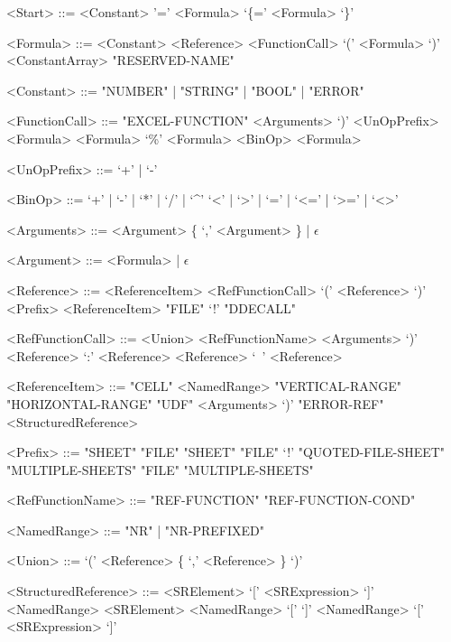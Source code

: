 \begin{grammar}
<Start> ::= <Constant>
	\alt '=' <Formula>
	\alt `\{=' <Formula> `\}'

<Formula> ::= <Constant>
         \alt <Reference>
         \alt <FunctionCall>
         \alt `(' <Formula> `)'
         \alt <ConstantArray>
         \alt "RESERVED-NAME"
         
<Constant> ::= "NUMBER" | "STRING" | "BOOL" | "ERROR"
         
<FunctionCall> ::= "EXCEL-FUNCTION" <Arguments> `)'
		\alt <UnOpPrefix> <Formula>
		\alt <Formula> `\%'
		\alt <Formula> <BinOp> <Formula>
		
<UnOpPrefix> ::= `+' | `-'

<BinOp> ::= `+' | `-' | `*' | `/' | `\textasciicircum'
	\alt `<' | `>' | `=' | `<=' | `>=' | `<>'

	
<Arguments> ::= <Argument> \{ `,' <Argument> \} | $\epsilon$

<Argument> ::= <Formula> | $\epsilon$

<Reference> ::= <ReferenceItem>
    \alt <RefFunctionCall>
	\alt `(' <Reference> `)' 
	\alt <Prefix> <ReferenceItem>
	\alt "FILE" `!' "DDECALL"

<RefFunctionCall> ::= <Union>
    \alt <RefFunctionName> <Arguments> `)'
    \alt <Reference> `:' <Reference>
	\alt <Reference> `\ ' <Reference>
    
<ReferenceItem> ::= "CELL"
	\alt <NamedRange>
	\alt "VERTICAL-RANGE"
	\alt "HORIZONTAL-RANGE"
	\alt "UDF" <Arguments> `)'
	\alt "ERROR-REF"
	\alt <StructuredReference>
	
<Prefix> ::= "SHEET"
	\alt "FILE" "SHEET"
	\alt "FILE" `!'
	\alt "QUOTED-FILE-SHEET"
	\alt "MULTIPLE-SHEETS"
	\alt "FILE" "MULTIPLE-SHEETS"

<RefFunctionName> ::= "REF-FUNCTION"
			\alt "REF-FUNCTION-COND"
	
<NamedRange> ::= "NR" | "NR-PREFIXED"

<Union> ::= `(' <Reference> \{ `,' <Reference> \} `)'

<StructuredReference> ::= <SRElement>
	\alt `[' <SRExpression> `]'
	\alt <NamedRange> <SRElement>
	\alt <NamedRange> `[' `]'
	\alt <NamedRange> `[' <SRExpression> `]'



\end{grammar}
